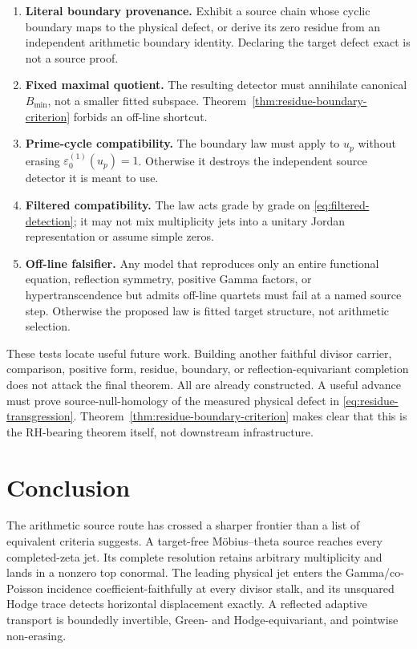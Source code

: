 \documentclass[11pt]{article}
\theoremstyle{definition}
\theoremstyle{remark}
\begin{document}
\begin{enumerate}[leftmargin=2.2em]
\item \textbf{Literal boundary provenance.}  Exhibit a source chain whose
      cyclic boundary maps to the physical defect, or derive its zero residue
      from an independent arithmetic boundary identity.  Declaring the
      target defect exact is not a source proof.
\item \textbf{Fixed maximal quotient.}  The resulting detector must
      annihilate canonical \(B_{\min}\), not a smaller fitted subspace.
      Theorem~\ref{thm:residue-boundary-criterion} forbids an off-line
      shortcut.
\item \textbf{Prime-cycle compatibility.}  The boundary law must apply to
      \(u_p\) without erasing \(\varepsilon_0^{(1)}(u_p)=1\).  Otherwise it
      destroys the independent source detector it is meant to use.
\item \textbf{Filtered compatibility.}  The law acts grade by grade on
      \eqref{eq:filtered-detection}; it may not mix multiplicity jets into a
      unitary Jordan representation or assume simple zeros.
\item \textbf{Off-line falsifier.}  Any model that reproduces only an entire
      functional equation, reflection symmetry, positive Gamma factors, or
      hypertranscendence but admits off-line quartets must fail at a named
      source step.  Otherwise the proposed law is fitted target structure,
      not arithmetic selection.
\end{enumerate}

These tests locate useful future work.  Building another faithful divisor
carrier, comparison, positive form, residue, boundary, or
reflection-equivariant completion does not attack the final theorem.  All
are already constructed.  A useful advance must prove source-null-homology
of the measured physical defect in \eqref{eq:residue-transgression}.
Theorem~\ref{thm:residue-boundary-criterion} makes clear that this is the
RH-bearing theorem itself, not downstream infrastructure.

\section{Conclusion}

The arithmetic source route has crossed a sharper frontier than a list of
equivalent criteria suggests.  A target-free M\"obius--theta source reaches
every completed-zeta jet.  Its complete resolution retains arbitrary
multiplicity and lands in a nonzero top conormal.  The leading physical jet
enters the Gamma/co-Poisson incidence coefficient-faithfully at every divisor
stalk, and its unsquared Hodge trace detects horizontal displacement exactly.
A reflected adaptive transport is boundedly invertible, Green- and
Hodge-equivariant, and pointwise non-erasing.
\end{document}
